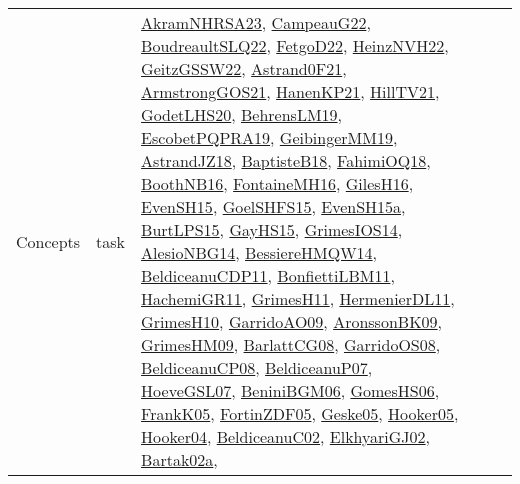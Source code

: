 {\begin{longtable}{lp{3cm}>{\raggedright}p{6cm}>{\raggedright}p{6cm}p{8cm}}
Concepts & task & \href{articles/AkramNHRSA23.pdf}{AkramNHRSA23}\cite{AkramNHRSA23}, \href{articles/CampeauG22.pdf}{CampeauG22}\cite{CampeauG22}, \href{papers/BoudreaultSLQ22.pdf}{BoudreaultSLQ22}\cite{BoudreaultSLQ22}, \href{articles/FetgoD22.pdf}{FetgoD22}\cite{FetgoD22}, \href{articles/HeinzNVH22.pdf}{HeinzNVH22}\cite{HeinzNVH22}, \href{papers/GeitzGSSW22.pdf}{GeitzGSSW22}\cite{GeitzGSSW22}, \href{papers/Astrand0F21.pdf}{Astrand0F21}\cite{Astrand0F21}, \href{papers/ArmstrongGOS21.pdf}{ArmstrongGOS21}\cite{ArmstrongGOS21}, \href{papers/HanenKP21.pdf}{HanenKP21}\cite{HanenKP21}, \href{papers/HillTV21.pdf}{HillTV21}\cite{HillTV21}, \href{papers/GodetLHS20.pdf}{GodetLHS20}\cite{GodetLHS20}, \href{papers/BehrensLM19.pdf}{BehrensLM19}\cite{BehrensLM19}, \href{articles/EscobetPQPRA19.pdf}{EscobetPQPRA19}\cite{EscobetPQPRA19}, \href{papers/GeibingerMM19.pdf}{GeibingerMM19}\cite{GeibingerMM19}, \href{papers/AstrandJZ18.pdf}{AstrandJZ18}\cite{AstrandJZ18}, \href{articles/BaptisteB18.pdf}{BaptisteB18}\cite{BaptisteB18}, \href{articles/FahimiOQ18.pdf}{FahimiOQ18}\cite{FahimiOQ18}, \href{papers/BoothNB16.pdf}{BoothNB16}\cite{BoothNB16}, \href{papers/FontaineMH16.pdf}{FontaineMH16}\cite{FontaineMH16}, \href{papers/GilesH16.pdf}{GilesH16}\cite{GilesH16}, \href{papers/EvenSH15.pdf}{EvenSH15}\cite{EvenSH15}, \href{articles/GoelSHFS15.pdf}{GoelSHFS15}\cite{GoelSHFS15}, \href{articles/EvenSH15a.pdf}{EvenSH15a}\cite{EvenSH15a}, \href{papers/BurtLPS15.pdf}{BurtLPS15}\cite{BurtLPS15}, \href{papers/GayHS15.pdf}{GayHS15}\cite{GayHS15}, \href{articles/GrimesIOS14.pdf}{GrimesIOS14}\cite{GrimesIOS14}, \href{papers/AlesioNBG14.pdf}{AlesioNBG14}\cite{AlesioNBG14}, \href{papers/BessiereHMQW14.pdf}{BessiereHMQW14}\cite{BessiereHMQW14}, \href{articles/BeldiceanuCDP11.pdf}{BeldiceanuCDP11}\cite{BeldiceanuCDP11}, \href{papers/BonfiettiLBM11.pdf}{BonfiettiLBM11}\cite{BonfiettiLBM11}, \href{articles/HachemiGR11.pdf}{HachemiGR11}\cite{HachemiGR11}, \href{papers/GrimesH11.pdf}{GrimesH11}\cite{GrimesH11}, \href{papers/HermenierDL11.pdf}{HermenierDL11}\cite{HermenierDL11}, \href{papers/GrimesH10.pdf}{GrimesH10}\cite{GrimesH10}, \href{articles/GarridoAO09.pdf}{GarridoAO09}\cite{GarridoAO09}, \href{papers/AronssonBK09.pdf}{AronssonBK09}\cite{AronssonBK09}, \href{papers/GrimesHM09.pdf}{GrimesHM09}\cite{GrimesHM09}, \href{papers/BarlattCG08.pdf}{BarlattCG08}\cite{BarlattCG08}, \href{articles/GarridoOS08.pdf}{GarridoOS08}\cite{GarridoOS08}, \href{papers/BeldiceanuCP08.pdf}{BeldiceanuCP08}\cite{BeldiceanuCP08}, \href{papers/BeldiceanuP07.pdf}{BeldiceanuP07}\cite{BeldiceanuP07}, \href{papers/HoeveGSL07.pdf}{HoeveGSL07}\cite{HoeveGSL07}, \href{papers/BeniniBGM06.pdf}{BeniniBGM06}\cite{BeniniBGM06}, \href{papers/GomesHS06.pdf}{GomesHS06}\cite{GomesHS06}, \href{papers/FrankK05.pdf}{FrankK05}\cite{FrankK05}, \href{papers/FortinZDF05.pdf}{FortinZDF05}\cite{FortinZDF05}, \href{papers/Geske05.pdf}{Geske05}\cite{Geske05}, \href{articles/Hooker05.pdf}{Hooker05}\cite{Hooker05}, \href{papers/Hooker04.pdf}{Hooker04}\cite{Hooker04}, \href{papers/BeldiceanuC02.pdf}{BeldiceanuC02}\cite{BeldiceanuC02}, \href{papers/ElkhyariGJ02.pdf}{ElkhyariGJ02}\cite{ElkhyariGJ02}, \href{papers/Bartak02a.pdf}{Bartak02a}\cite{Bartak02a}, 
\end{longtable}}
